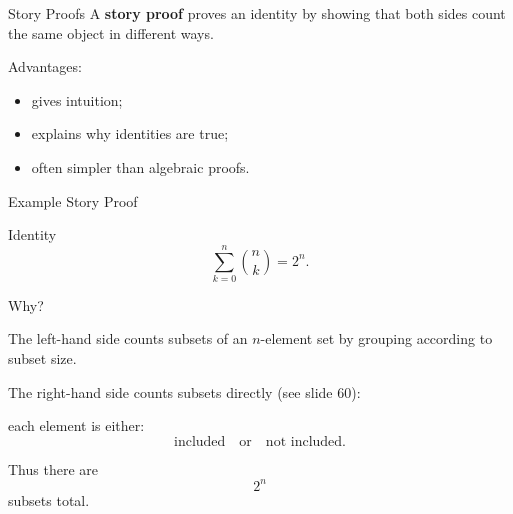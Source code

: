 
\begin{frame}{Story Proofs}
A \textbf{story proof} proves an identity by showing that both sides count the same object in different ways.

\vspace{0.25cm}

Advantages:

\begin{itemize}
    \item gives intuition;
    \item explains why identities are true;
    \item often simpler than algebraic proofs.
\end{itemize}
\end{frame}

\begin{frame}{Example Story Proof}
\begin{keybox}{Identity}
\[
\sum_{k=0}^{n}\binom{n}{k}=2^n.
\]
\end{keybox}

\vspace{0.25cm}

Why?

\vspace{0.2cm}

The left-hand side counts subsets of an $n$-element set by grouping according to subset size.

\vspace{0.25cm}

The right-hand side counts subsets directly (see slide 60):

each element is either:
\[
\text{included}
\quad \text{or} \quad
\text{not included}.
\]

Thus there are
\[
2^n
\]
subsets total.
\end{frame}



